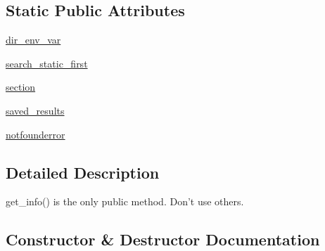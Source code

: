 \subsection*{Static Public Attributes}
\begin{DoxyCompactItemize}
\item 
\hyperlink{classnumpy_1_1distutils_1_1system__info_1_1system__info_aaf0d42cd3e47ba0332bb0f472821e8b2}{dir\+\_\+env\+\_\+var}
\item 
\hyperlink{classnumpy_1_1distutils_1_1system__info_1_1system__info_a6a2d2c14301d29f4fc074e50b0043adc}{search\+\_\+static\+\_\+first}
\item 
\hyperlink{classnumpy_1_1distutils_1_1system__info_1_1system__info_a01714a558544933167597bf98cf1071a}{section}
\item 
\hyperlink{classnumpy_1_1distutils_1_1system__info_1_1system__info_ac2f94d9def43b21efc72873a24a45d29}{saved\+\_\+results}
\item 
\hyperlink{classnumpy_1_1distutils_1_1system__info_1_1system__info_a7f940e231c59c246ab9750a49fc17ab2}{notfounderror}
\end{DoxyCompactItemize}


\subsection{Detailed Description}
\begin{DoxyVerb}get_info() is the only public method. Don't use others.
\end{DoxyVerb}
 

\subsection{Constructor \& Destructor Documentation}
\mbox{\label{classnumpy_1_1distutils_1_1system__info_1_1system__info_aa6306102e4461243e230f7cab008a959}} 
